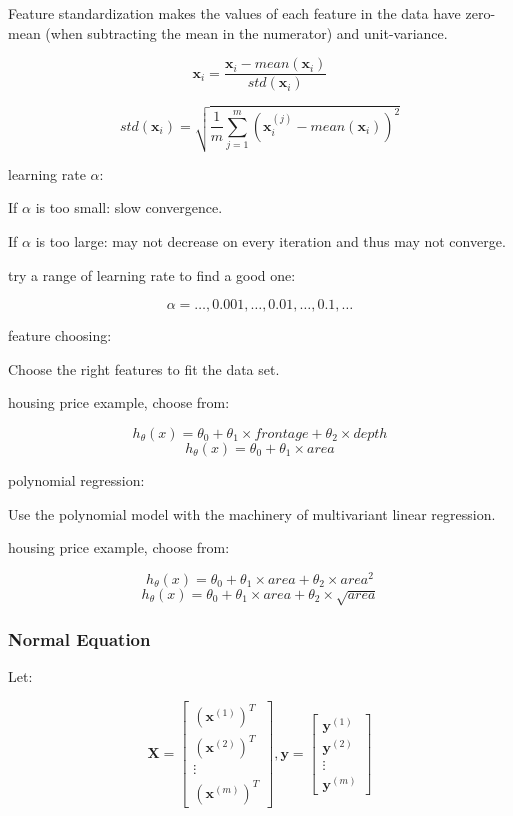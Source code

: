\documentclass{article}
\begin{document}
\noindent Feature standardization makes the values of each feature in the data have zero-mean (when subtracting the mean in the numerator) and unit-variance.

\[\textbf{x}_i = \frac{\textbf{x}_i - mean(\textbf{x}_i)}{std(\textbf{x}_i)}\]

\[std(\textbf{x}_i) = \sqrt{ \frac{1}{m} \sum_{j = 1}^m (\textbf{x}^{(j)}_i - mean(\textbf{x}_i))^2}\]

\noindent learning rate \(\alpha\):

\noindent If \(\alpha\) is too small: slow convergence.

\noindent If \(\alpha\) is too large: may not decrease on every iteration and thus may not converge.

\noindent try a range of learning rate to find a good one:

\[\alpha = \dots, 0.001, \dots, 0.01, \dots, 0.1, \dots\]

\noindent feature choosing:

\noindent Choose the right features to fit the data set.

\noindent housing price example, choose from:

\[h_{\theta}(x) = \theta_0 + \theta_1 \times frontage + \theta_2 \times depth\]
\[h_{\theta}(x) = \theta_0 + \theta_1 \times area\]

\noindent polynomial regression:

\noindent Use the polynomial model with the machinery of multivariant linear regression.

\noindent housing price example, choose from:

\[h_{\theta}(x) = \theta_0 + \theta_1 \times area + \theta_2 \times area^2\]
\[h_{\theta}(x) = \theta_0 + \theta_1 \times area + \theta_2 \times \sqrt{area}\]

\subsubsection{Normal Equation}

\noindent Let:

\[
\textbf{X} = 
\begin{bmatrix}
(\textbf{x}^{(1)})^T\\
(\textbf{x}^{(2)})^T\\
\vdots\\
(\textbf{x}^{(m)})^T
\end{bmatrix}
,
\textbf{y} = 
\begin{bmatrix}
\textbf{y}^{(1)}\\
\textbf{y}^{(2)}\\
\vdots\\
\textbf{y}^{(m)}
\end{bmatrix}
\]
\end{document}
